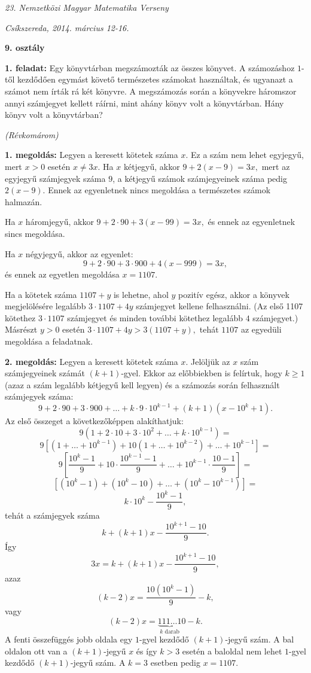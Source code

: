 \documentclass[a4paper,10pt]{article}
\newcommand{\ki}[2]{\hfill {\it #1 (#2)}\medskip}
\begin{document}
\begin{center} \Large {\em 23. Nemzetközi Magyar Matematika Verseny} \end{center}
\begin{center} \large{\em Csíkszereda, 2014. március 12-16.} \end{center}
\smallskip
\begin{center} \large{\bf 9. osztály} \end{center}
\bigskip 

{\bf 1. feladat: } Egy könyvtárban megszámozták az összes könyvet. A
számozáshoz $1$-től kez\-dő\-dő\-en egymást követő
természetes szá\-mo\-kat használtak, és ugyanazt a számot
nem írták rá két könyvre. A megszámozás során a
könyvekre háromszor annyi számjegyet kellett
ráírni, mint ahány könyv volt a könyvtárban.
Hány könyv volt a könyvtárban?

\ki{}{Révkomárom}\medskip

{\bf 1. megoldás: } Legyen a keresett kötetek száma $x$. Ez a
szám nem lehet egyjegyű, mert $x>0$ esetén $x\neq3x$. Ha
$x$ kétjegyű, akkor $9+2(x-9)=3x,$ mert az egyjegyű
számjegyek száma $9$, a kétjegyű számok
számjegyeinek száma pedig $2(x-9)$. Ennek az egyenletnek
nincs megoldása a természetes számok halmazán.

Ha $x$ háromjegyű, akkor $9+2\cdot90+3(x-99)=3x,$ és
ennek az egyenletnek sincs megoldása.

Ha $x$ négyjegyű, akkor az egyenlet:
\[
9+2\cdot90+3\cdot900+4(x-999)=3x,%
\]
és ennek az egyetlen megoldása $x=1107$.

 Ha a kötetek
száma $1107+y$ is lehetne, ahol $y$ pozitív egész,
akkor a könyvek megjelölésére legalább
$3\cdot1107+4y$ számjegyet kellene felhasználni. (Az első
1107 kötethez $3\cdot 1107$ számjegyet és minden további
kötethez legalább $4$ számjegyet.) Másrészt $y>0$ esetén
$3\cdot1107+4y>3(1107+y),$ tehát $1107$ az egyedüli
megoldása a feladatnak.

\medskip

{\bf 2. megoldás: } Legyen a keresett kötetek száma $x$. Jelöljük az $x$
szám számjegyeinek számát $(k+1)$-gyel. Ekkor az
előbbiekben is felírtuk, hogy $k\geq1$ (azaz a szám
legalább kétjegyű kell legyen) és a számozás
során felhasznált számjegyek száma:
$$9+2\cdot90+3\cdot900+\ldots+k\cdot9\cdot10^{k-1}+(k+1)(x-10^{k}+1).
$$
Az első összeget a következőképpen alakíthatjuk:
$$9\left(  1+2\cdot10+3\cdot10^{2}+\ldots+k\cdot10^{k-1}\right)=$$
$$9\left[  \left(  1+\ldots+10^{k-1}\right)  +10\left(  1+
\ldots+10^{k-2}\right)  +\ldots+10^{k-1}\right]=$$ $$9\left[
\frac{10^{k}-1}{9}+10\cdot\frac{10^{k-1}-1}{9}+\ldots+10^{k-1}\cdot\frac{10-1}{9}\right]=$$
$$\left[  \left(  10^{k}-1\right)  +\left( 10^{k}-10\right) +\ldots+\left( 10^{k}-10^{k-1}\right) \right]
=$$ $$ k\cdot10^{k}-\frac{10^{k}-1}{9},$$ tehát a számjegyek
száma
$$ k+(k+1)x-\frac{10^{k+1}-10}{9}.%
$$
Így
\[
3x=k+(k+1)x-\frac{10^{k+1}-10}{9},%
\]
azaz
\[
(k-2)x=\frac{10(10^{k}-1)}{9}-k,%
\]
vagy
\[
(k-2)x={\underbrace{111\ldots1}_{k \mbox{ darab}}0}-k.%
\]
A fenti összefüggés jobb oldala egy $1$-gyel
kezdődő $(k+1)$-jegyű szám. A bal oldalon ott van a
$(k+1)$-jegyű $x$ és így $k>3$ esetén a baloldal
nem lehet $1$-gyel kezdődő $(k+1)$-jegyű szám. A
$k=3$ esetben pedig $x=1107$.
\end{document}
